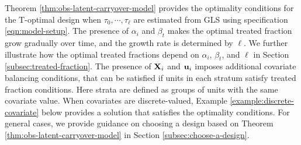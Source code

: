 	Theorem \ref{thm:obs-latent-carryover-model} provides the optimality conditions for the T-optimal design when $\tau_0, \cdots, \tau_\ell$ are estimated from GLS using specification \eqref{eqn:model-setup}. The presence of $\alpha_i$ and $\beta_t$ makes the optimal treated fraction grow gradually over time, and the growth rate is determined by $\ell$. We further illustrate how the optimal treated fractions depend on $\alpha_i$, $\beta_t$, and $\ell$ in Section \ref{subsec:treated-fraction}. The presence of $\mathbf{X}_i$ and $\mathbf{u}_i$ imposes additional covariate balancing conditions, that can be satisfied if units in each stratum satisfy treated fraction conditions. Here strata are defined as groups of units with the same covariate value.  When covariates are discrete-valued, Example \ref{example:discrete-covariate} below provides a solution that satisfies the optimality conditions. For general cases, we provide guidance on choosing a design based on Theorem \ref{thm:obs-latent-carryover-model} in Section \ref{subsec:choose-a-design}.
	
